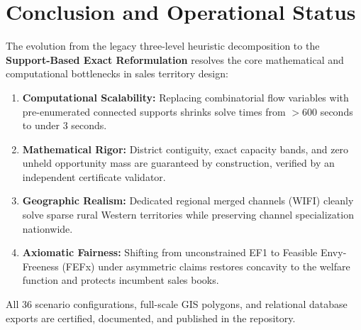 \documentclass[11pt,a4paper]{article}
\theoremstyle{plain}
\theoremstyle{definition}
\begin{document}
\section{Conclusion and Operational Status}

The evolution from the legacy three-level heuristic decomposition to the \textbf{Support-Based Exact Reformulation} resolves the core mathematical and computational bottlenecks in sales territory design:
\begin{enumerate}[leftmargin=1.8em]
    \item \textbf{Computational Scalability:} Replacing combinatorial flow variables with pre-enumerated connected supports shrinks solve times from $>600$ seconds to under $3$ seconds.
    \item \textbf{Mathematical Rigor:} District contiguity, exact capacity bands, and zero unheld opportunity mass are guaranteed by construction, verified by an independent certificate validator.
    \item \textbf{Geographic Realism:} Dedicated regional merged channels (WIFI) cleanly solve sparse rural Western territories while preserving channel specialization nationwide.
    \item \textbf{Axiomatic Fairness:} Shifting from unconstrained EF1 to Feasible Envy-Freeness (FEFx) under asymmetric claims restores concavity to the welfare function and protects incumbent sales books.
\end{enumerate}
All 36 scenario configurations, full-scale GIS polygons, and relational database exports are certified, documented, and published in the repository.
\end{document}
